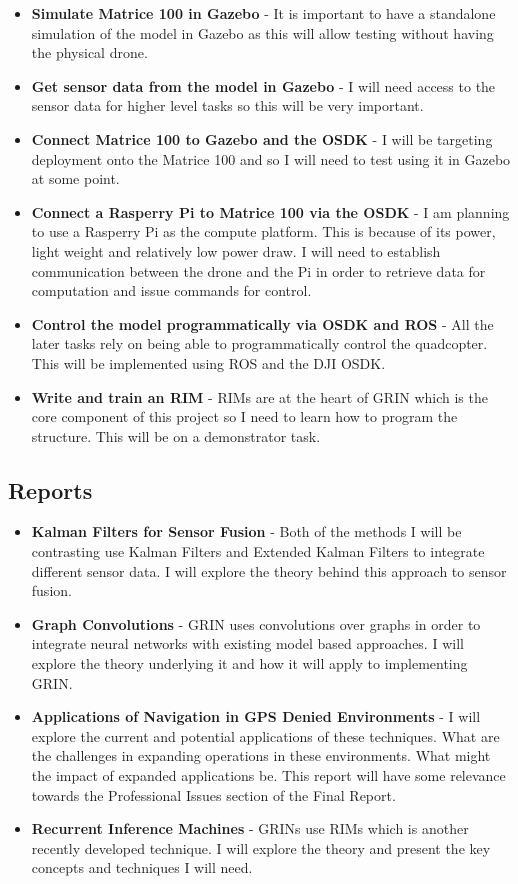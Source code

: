 \documentclass[]{final_report}
\begin{document}
\begin{itemize}
  \item \textbf{Simulate Matrice 100 in Gazebo} - It is important to have a standalone simulation of the model in Gazebo as this will allow testing without having the physical drone.
  \item \textbf{Get sensor data from the model in Gazebo} - I will need access to the sensor data for higher level tasks so this will be very important.
  \item \textbf{Connect Matrice 100 to Gazebo and the OSDK} - I will be targeting deployment onto the Matrice 100 and so I will need to test using it in Gazebo at some point.
  \item \textbf{Connect a Rasperry Pi to Matrice 100 via the OSDK} - I am planning to use a Rasperry Pi as the compute platform. This is because of its power, light weight and relatively low power draw. I will need to establish communication between the drone and the Pi in order to retrieve data for computation and issue commands for control.
  \item \textbf{Control the model programmatically via OSDK and ROS} - All the later tasks rely on being able to programmatically control the quadcopter. This will be implemented using ROS and the DJI OSDK.
  \item \textbf{Write and train an RIM} - RIMs are at the heart of GRIN which is the core component of this project so I need to learn how to program the structure. This will be on a demonstrator task.
\end{itemize}

\subsection{Reports}
\begin{itemize}
  \item \textbf{Kalman Filters for Sensor Fusion} - Both of the methods I will be contrasting use Kalman Filters and Extended Kalman Filters to integrate different sensor data. I will explore the theory behind this approach to sensor fusion.
  \item \textbf{Graph Convolutions} - GRIN uses convolutions over graphs in order to integrate neural networks with existing model based approaches. I will explore the theory underlying it and how it will apply to implementing GRIN.
  \item \textbf{Applications of Navigation in GPS Denied Environments} - I will explore the current and potential applications of these techniques. What are the challenges in expanding operations in these environments. What might the impact of expanded applications be. This report will have some relevance towards the Professional Issues section of the Final Report.
  \item \textbf{Recurrent Inference Machines} - GRINs use RIMs which is another recently developed technique. I will explore the theory and present the key concepts and techniques I will need.
\end{itemize}
\end{document}
